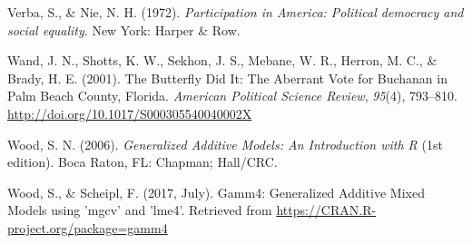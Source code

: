 \documentclass[12pt,twoside]{reedthesis}
\begin{document}
  \hypertarget{ref-verba_participation_1972}{}
  Verba, S., \& Nie, N. H. (1972). \emph{Participation in America:
  Political democracy and social equality}. New York: Harper \& Row.
  
  \hypertarget{ref-wand_butterfly_2001}{}
  Wand, J. N., Shotts, K. W., Sekhon, J. S., Mebane, W. R., Herron, M. C.,
  \& Brady, H. E. (2001). The Butterfly Did It: The Aberrant Vote for
  Buchanan in Palm Beach County, Florida. \emph{American Political Science
  Review}, \emph{95}(4), 793--810.
  \url{http://doi.org/10.1017/S000305540040002X}
  
  \hypertarget{ref-wood_generalized_2006}{}
  Wood, S. N. (2006). \emph{Generalized Additive Models: An Introduction
  with R} (1st edition). Boca Raton, FL: Chapman; Hall/CRC.
  
  \hypertarget{ref-wood_gamm4:_2017}{}
  Wood, S., \& Scheipl, F. (2017, July). Gamm4: Generalized Additive Mixed
  Models using 'mgcv' and 'lme4'. Retrieved from
  \url{https://CRAN.R-project.org/package=gamm4}


\end{document}
